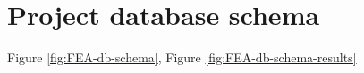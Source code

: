 \section{Project database schema}
\label{sec:project-db-schema}




Figure \ref{fig:FEA-db-schema}, Figure \ref{fig:FEA-db-schema-results}


